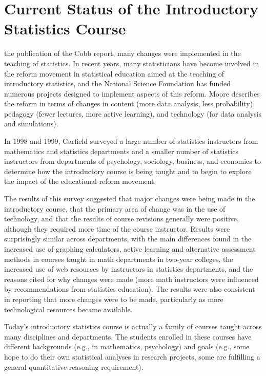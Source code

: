 \documentclass[twoside,openany]{tufte-book}
\begin{document}
\section{\textbf{Current Status of the Introductory Statistics Course}}

the publication of the Cobb report, many changes were implemented in the teaching of statistics. In recent years, many statisticians have become involved in the reform movement in statistical education aimed at the teaching of introductory statistics, and the National Science Foundation has funded numerous projects designed to implement aspects of this reform\cite{cobb2}. Moore\cite{moore} describes the reform in terms of changes in content (more data analysis, less probability), pedagogy (fewer lectures, more active learning), and technology (for data analysis and simulations).   

In 1998 and 1999, Garfield\cite{garfield} surveyed a large number of statistics instructors from mathematics and statistics departments and a smaller number of statistics instructors from departments of psychology, sociology, business, and economics to determine how the introductory course is being taught and to begin to explore the impact of the educational reform movement.
 
The results of this survey suggested that major changes were being made in the introductory course, that the primary area of change was in the use of technology, and that the results of course revisions generally were positive, although they required more time of the course instructor. Results were surprisingly similar across departments, with the main differences found in the increased use of graphing calculators, active learning and alternative assessment methods in courses taught in math departments in two-year colleges, the increased use of web resources by instructors in statistics departments, and the reasons cited for why changes were made (more math instructors were influenced by recommendations from statistics education).  The results were also consistent in reporting that more changes were to be made, particularly as more technological resources became available.

Today's introductory statistics course is actually a family of courses taught across many disciplines and departments. The students enrolled in these courses have different backgrounds (e.g., in mathematics, psychology) and goals (e.g., some hope to do their own statistical analyses in research projects, some are fulfilling a general quantitative reasoning requirement). 
\end{document}
